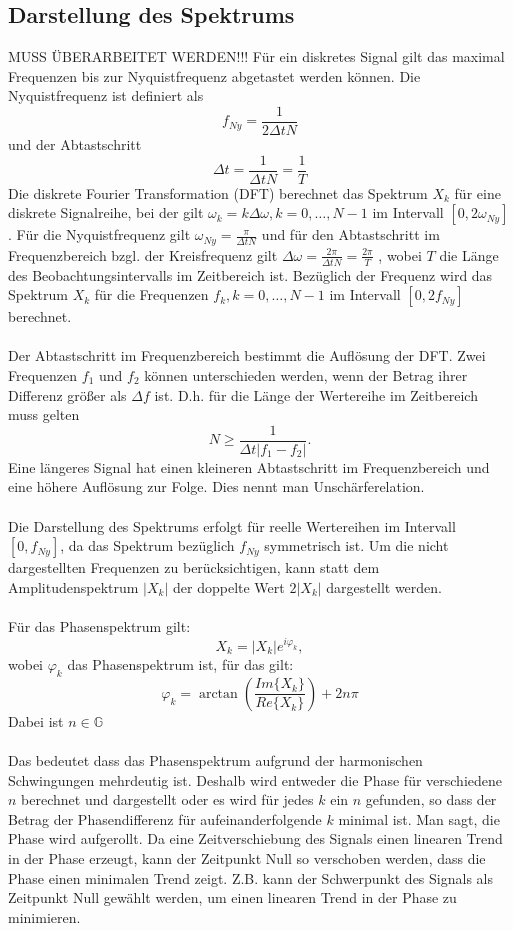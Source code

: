 \subsection{Darstellung des Spektrums}
{\color{red} MUSS ÜBERARBEITET WERDEN!!!}
Für ein diskretes Signal gilt das maximal Frequenzen bis zur Nyquistfrequenz abgetastet werden können. Die Nyquistfrequenz ist definiert als
\begin{equation}
f_{Ny} = \frac {1} {2 \Delta t N}
\end{equation}
und der Abtastschritt
\[
\Delta t =\frac{1}{\Delta t N} = \frac{1}{T}
\]
Die diskrete Fourier Transformation (DFT) berechnet das Spektrum $X_k$ für eine diskrete Signalreihe, bei der gilt $\omega_k= k \Delta \omega, k=0,\dots, N-1$ im Intervall $[0,2\omega_{Ny}]$. Für die Nyquistfrequenz gilt $\omega_{Ny} = \frac {\pi} {\Delta t N}$ und für den Abtastschritt im Frequenzbereich bzgl. der Kreisfrequenz gilt $\Delta\omega=\frac{2\pi}{\Delta t N} = \frac{2\pi}{T}$ , wobei $T$ die Länge des Beobachtungsintervalls im Zeitbereich ist. Bezüglich der Frequenz wird das Spektrum $X_k$ für die Frequenzen  $f_k, k=0,\dots, N-1$ im Intervall $[0,2f_{Ny}]$ berechnet.\\\\
Der Abtastschritt im Frequenzbereich bestimmt die Auflösung der DFT. Zwei Frequenzen $f_1$ und $f_2$ können unterschieden werden, wenn der Betrag ihrer Differenz größer als $ \Delta f$ ist. D.h. für die Länge der Wertereihe im Zeitbereich muss  gelten
\[
N \ge \frac{1}{\Delta t | f_1 - f_2 |}.
\]
Eine längeres Signal hat einen kleineren Abtastschritt im Frequenzbereich und eine höhere Auflösung zur Folge. Dies nennt man Unschärferelation.\\\\
Die Darstellung des Spektrums erfolgt für reelle Wertereihen im Intervall $[0,f_{Ny}]$, da das Spektrum bezüglich $f_{Ny}$ symmetrisch ist. Um die nicht dargestellten Frequenzen zu berücksichtigen, kann statt dem Amplitudenspektrum $|X_k|$ der doppelte Wert $2|X_k|$ dargestellt werden.\\\\
Für das Phasenspektrum gilt:
\[
X_k= |X_k|e^{i\varphi_k},
\]
wobei $\varphi_k$ das Phasenspektrum ist, für das gilt:
\[
\varphi_k = \arctan \left(\frac{Im\{X_k\}}{Re\{X_k\}}\right) + 2n\pi
\]
{\small Dabei ist $n \in \mathbb{G}$}\\\\
Das bedeutet dass das Phasenspektrum aufgrund der harmonischen Schwingungen mehrdeutig ist. Deshalb wird entweder die Phase für verschiedene $n$ berechnet und dargestellt oder es wird für jedes $k$ ein $n$ gefunden, so dass der Betrag der Phasendifferenz für aufeinanderfolgende $k$ minimal ist. Man sagt, die Phase wird aufgerollt. Da eine Zeitverschiebung des Signals einen linearen Trend in der Phase erzeugt, kann der Zeitpunkt Null so verschoben werden, dass die Phase einen minimalen Trend zeigt. Z.B. kann der Schwerpunkt des Signals als Zeitpunkt Null gewählt werden, um einen linearen Trend in der Phase zu minimieren.

